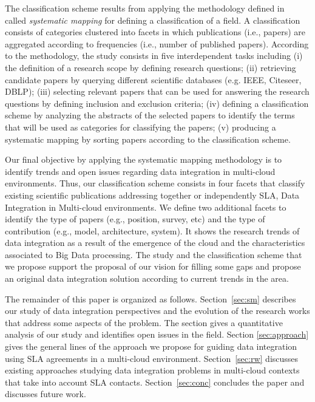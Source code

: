 The classification scheme results from  applying the  methodology defined in~\cite{SM:Petersen:2008} called  \textit{systematic mapping}  for defining a classification of a field. A classification consists of categories clustered into facets in which publications (i.e., papers) are aggregated according to frequencies (i.e., number of published papers). According to the methodology, the study consists in  five interdependent tasks including (i) the definition of a research scope by defining research questions; (ii) retrieving candidate papers by querying different scientific databases (e.g. IEEE, Citeseer, DBLP); (iii) selecting relevant papers that can be used for answering the research questions by defining inclusion and exclusion criteria; (iv) defining a classification scheme by analyzing the abstracts of the selected papers to identify the terms that will be used as categories for classifying the papers; (v) producing a systematic mapping by sorting papers according to the classification scheme. 

Our final objective by applying the systematic mapping methodology is to identify trends and open issues regarding data integration in multi-cloud environments. Thus, our classification scheme consists in four facets that classify existing scientific publications addressing  together or independently SLA, Data Integration in Multi-cloud environments. We define two additional facets to identify the type of papers (e.g., position, survey, etc) and the type of contribution (e.g., model, architecture, system). It shows the research trends of data integration as a result of the emergence of the cloud and the characteristics associated to Big Data processing. The study and the classification scheme that we propose support  the proposal of our vision for filling some gaps and propose an original data integration solution according to current trends in the area. 


The remainder of this paper is organized as follows. 
Section~\ref{sec:sm} describes our study of  data integration perspectives and the evolution of the research works that address some aspects of the problem. The section gives a quantitative analysis of our study and identifies open issues in the field. Section \ref{sec:approach} gives the general lines of the approach we propose for guiding data integration using SLA agreements in a multi-cloud environment.  Section~\ref{sec:rw} discusses existing approaches studying data integration problems in multi-cloud contexts that take into account SLA contacts.
Section~\ref{sec:conc} concludes the paper and discusses future work. 


